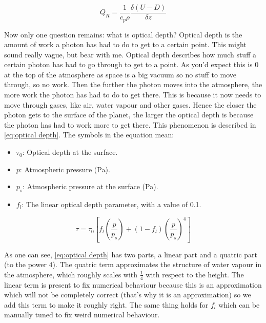 \begin{equation}
    \label{eq:heat layer}
    Q_R = \frac{1}{c_p\rho}\frac{\delta(U - D)}{\delta z}
\end{equation}

Now only one question remains: what is optical depth? Optical depth is the amount of work a photon has had to do to get to a certain point. This might sound really vague, but bear with me. 
Optical depth describes how much stuff a certain photon has had to go through to get to a point. As you'd expect this is $0$ at the top of the atmosphere as space is a big vacuum so no stuff to 
move through, so no work. Then the further the photon moves into the atmosphere, the more work the photon has had to do to get there. This is because it now needs to move through gases, like air,
water vapour and other gases. Hence the closer the photon gets to the surface of the planet, the larger the optical depth is because the photon has had to work more to get there. This phenomenon
is described in \autoref{eq:optical depth}. The symbols in the equation mean:

\begin{itemize}
    \item $\tau_0$: Optical depth at the surface.
    \item $p$: Atmospheric pressure (\si{Pa}).
    \item $p_s$: Atmospheric pressure at the surface (\si{Pa}).
    \item $f_l$: The linear optical depth parameter, with a value of 0.1.
\end{itemize}

\begin{equation}
    \label{eq:optical depth}
    \tau = \tau_0[f_l(\frac{p}{p_s}) + (1 - f_l)(\frac{p}{p_s})^4]
\end{equation}

As one can see, \autoref{eq:optical depth} has two parts, a linear part and a quatric part (to the power $4$). The quatric term approximates the structure of water vapour in the atmosphere, which 
roughly scales with $\frac{1}{4}$ with respect to the height. The linear term is present to fix numerical behaviour because this is an approximation which will not be completely correct (that's
why it is an approximation) so we add this term to make it roughly right. The same thing holds for $f_l$ which can be manually tuned to fix weird numerical behaviour.

